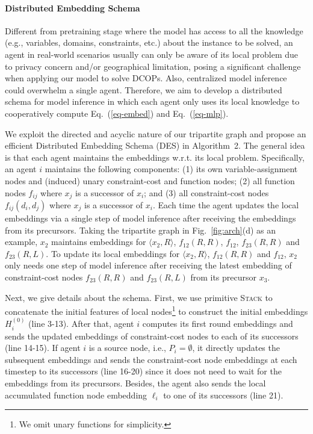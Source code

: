 \documentclass[letterpaper]{article} %
\begin{document}
\paragraph{Distributed Embedding Schema}
Different from pretraining stage where the model has access to all the knowledge (e.g., variables, domains, constraints, etc.) about the instance to be solved, an agent in real-world scenarios usually can only be aware of its local problem due to privacy concern and/or geographical limitation, posing a significant challenge when applying our model to solve DCOPs. Also, centralized model inference could overwhelm a single agent. Therefore, we aim to develop a distributed schema for model inference in which each agent only uses its local knowledge to cooperatively compute Eq.~(\ref{eq-embed}) and Eq.~(\ref{eq-mlp}).


We
exploit the directed and acyclic nature of our tripartite graph and propose an efficient Distributed Embedding Schema (DES) in Algorithm~2. The general idea is that each agent maintains the embeddings w.r.t. its local problem. Specifically, an agent $i$ maintains the following components: (1) its own variable-assignment nodes and (induced) unary constraint-cost and function nodes; (2) all function nodes $f_{ij}$ where $x_j$ is a successor of $x_i$; and (3) all constraint-cost nodes $f_{ij}(d_i,d_j)$ where $x_j$ is a successor of $x_i$. Each time the agent updates the local embeddings via a single step of model inference after receiving the embeddings from its precursors. Taking the tripartite graph in Fig.~\ref{fig:arch}(d) as an example, $x_2$ maintains embeddings for $\langle x_2,R\rangle$, $f_{12}(R,R)$, $f_{12}$, $f_{23}(R,R)$ and $f_{23}(R,L)$. To update its local embeddings for $\langle x_2,R\rangle$, $f_{12}(R,R)$ and $f_{12}$, $x_2$ only needs one step of model inference after receiving the latest embedding of constraint-cost nodes $f_{23}(R,R)$ and $f_{23}(R,L)$ from its precursor $x_3$.


Next, we give details about the schema. First, we use primitive \textsc{Stack} to concatenate the initial features of local nodes\footnote{We omit unary functions for simplicity.} to construct the initial embeddings $H^{(0)}_i$ (line 3-13). After that, agent $i$ computes its first round embeddings and sends the updated embeddings of constraint-cost nodes to each of its successors (line 14-15). If agent $i$ is a source node, i.e., $P_i=\emptyset$, it directly updates the subsequent embeddings and sends the constraint-cost node embeddings at each timestep to its successors (line 16-20) since it does not need to wait for the embeddings from its precursors. Besides, the agent also sends the local accumulated function node embedding $\ell_i$ to one of its successors (line 21).
\end{document}

